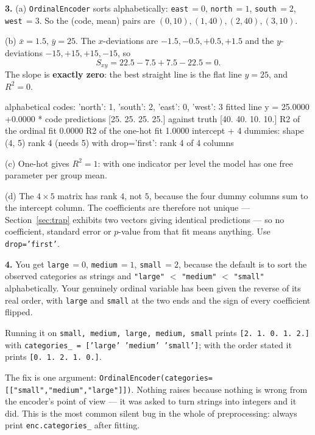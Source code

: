 \documentclass[11pt]{article}
\begin{document}
\medskip
\textbf{3.} (a) \texttt{OrdinalEncoder} sorts alphabetically:
\texttt{east}$\,=0$, \texttt{north}$\,=1$, \texttt{south}$\,=2$,
\texttt{west}$\,=3$. So the (code, mean) pairs are
$(0,10), (1,40), (2,40), (3,10)$.

(b) $\bar x = 1.5$, $\bar y = 25$. The $x$-deviations are
$-1.5, -0.5, +0.5, +1.5$ and the $y$-deviations $-15, +15, +15, -15$, so
\[
  S_{xy} = 22.5 - 7.5 + 7.5 - 22.5 = 0 .
\]
The slope is \textbf{exactly zero}: the best straight line is the flat line
$y = 25$, and $R^2 = 0$.

\begin{codeout}
alphabetical codes: {'north': 1, 'south': 2, 'east': 0, 'west': 3}
   fitted line y = 25.0000 +0.0000 * code
   predictions [25. 25. 25. 25.] against truth [40. 40. 10. 10.]
   R2 of the ordinal fit 0.0000
   R2 of the one-hot fit 1.0000
   intercept + 4 dummies: shape (4, 5) rank 4 (needs 5)
   with drop='first': rank 4 of 4 columns
\end{codeout}

(c) One-hot gives $R^2 = 1$: with one indicator per level the model has one
free parameter per group mean.

(d) The $4\times5$ matrix has rank $4$, not $5$, because the four dummy
columns sum to the intercept column. The coefficients are therefore not
unique --- Section~\ref{sec:trap} exhibits two vectors giving identical
predictions --- so no coefficient, standard error or $p$-value from that fit
means anything. Use \texttt{drop='first'}.

\medskip
\textbf{4.} You get \texttt{large}$\,=0$, \texttt{medium}$\,=1$,
\texttt{small}$\,=2$, because the default is to sort the observed categories
as strings and \texttt{"large"} $<$ \texttt{"medium"} $<$ \texttt{"small"}
alphabetically. Your genuinely ordinal variable has been given the reverse of
its real order, with \texttt{large} and \texttt{small} at the two ends and the
sign of every coefficient flipped.

Running it on \texttt{small, medium, large, medium, small} prints
\texttt{[2.\ 1.\ 0.\ 1.\ 2.]} with
\texttt{categories\_ = ['large' 'medium' 'small']}; with the order stated it
prints \texttt{[0.\ 1.\ 2.\ 1.\ 0.]}.

The fix is one argument:
\texttt{OrdinalEncoder(categories=[["small","medium","large"]])}. Nothing
raises because nothing is wrong from the encoder's point of view --- it was
asked to turn strings into integers and it did. This is the most common silent
bug in the whole of preprocessing: always print \texttt{enc.categories\_}
after fitting.
\end{document}
